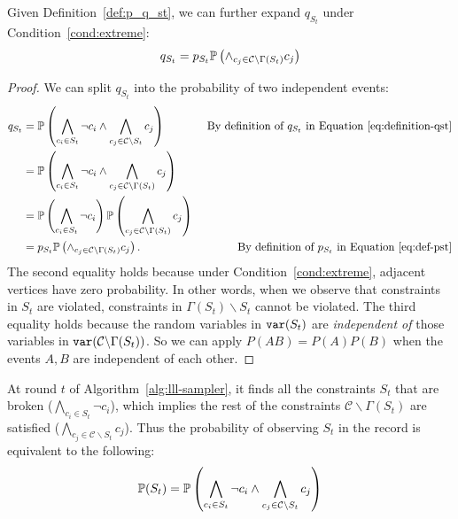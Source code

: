 \begin{lemma} \label{lem:recursion_start}
    Given Definition~\ref{def:p_q_st}, we can further expand $q_{S_t}$ under Condition~\ref{cond:extreme}:
    \begin{equation*}
        q_{S_t}= p_{S_t}\mathbb{P} \left( \wedge_{c_j \in \mathcal{C}\backslash \Gamma(S_t)}c_j\right)
    \end{equation*}
    \begin{proof}
        We can split $q_{S_t}$ into the probability of two independent events:
        \begin{align*}
            q_{S_t} & =\mathbb{P}\left(\bigwedge_{c_i \in S_t}\neg{c}_i \wedge \bigwedge_{c_j \in \mathcal{C}\backslash S_t}c_j\right)                   & \text{ By definition of $q_{S_t}$ in Equation~\eqref{eq:definition-qst}} \\
                    & =\mathbb{P}\left(\bigwedge_{c_i \in S_t}\neg{c}_i \wedge \bigwedge_{c_j \in \mathcal{C}\backslash \Gamma(S_t)}c_j\right)                                                                                      \\
                    & =\mathbb{P}\left(\bigwedge_{c_i \in S_t}\neg{c}_i\right) \mathbb{P} \left( \bigwedge_{c_j \in \mathcal{C}\backslash \Gamma(S_t)}c_j\right)                                                                            \\
                    & = p_{S_t}\mathbb{P} \left( \wedge_{c_j \in \mathcal{C}\backslash \Gamma(S_t)}c_j\right).                                           & \text{ By definition of $p_{S_t}$ in Equation~\eqref{eq:def-pst}}
        \end{align*}
        The second equality holds because under  Condition~\ref{cond:extreme}, adjacent vertices have zero probability. In other words, when we observe that constraints in $S_t$ are violated, constraints in $\Gamma(S_t)\backslash S_t$ cannot be violated. The third equality holds because the random variables in $\mathtt{var}(S_t)$ are \textit{independent of}
        those variables in $\mathtt{var}(\mathcal{C}\backslash\Gamma(S_t))$. {So we can apply $P(AB)=P(A)P(B)$ when the events $A,B$  are independent of each other.}
    \end{proof}
\end{lemma}

\begin{remark} \label{rem:equal}
    At round $t$ of Algorithm~\ref{alg:lll-sampler},  it finds all the constraints $S_t$ that are broken ($\bigwedge_{c_i \in S_t}\neg{c}_i $), which implies the rest of the constraints $\mathcal{C}\backslash \Gamma(S_t)$ are satisfied ($\bigwedge_{c_j \in \mathcal{C}\backslash S_t}c_j$). Thus the probability of observing $S_t$ in the record is equivalent to the following:
    \begin{align} \label{eq:st-expand}
        \mathbb{P}(S_t)=\mathbb{P}\left(\bigwedge_{c_i \in S_t}\neg{c}_i \wedge \bigwedge_{c_j \in \mathcal{C}\backslash S_t}c_j\right)
    \end{align}
\end{remark}


